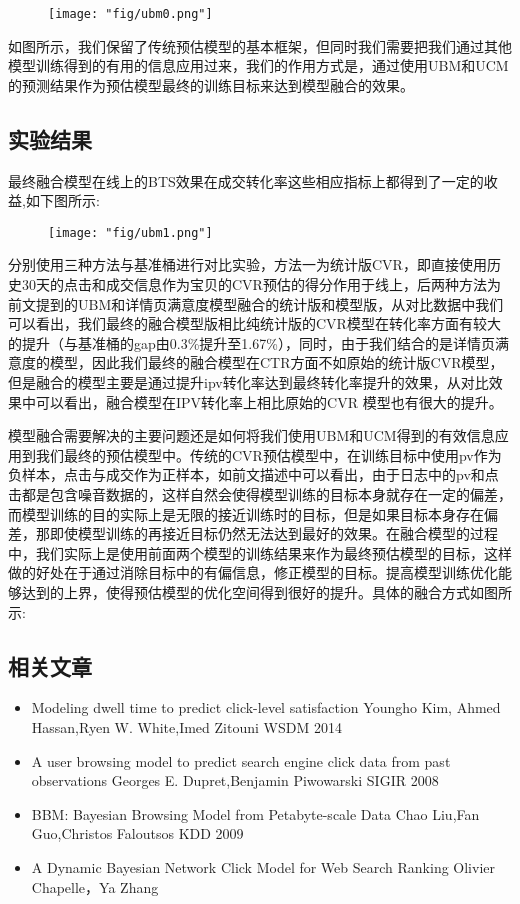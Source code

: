 \begin{figure}[!h]
	\centering
	\texttt{[image: "fig/ubm0.png"]}
	\caption{}
	\label{fig:ubm0}
\end{figure}
	

 如图所示，我们保留了传统预估模型的基本框架，但同时我们需要把我们通过其他模型训练得到的有用的信息应用过来，我们的作用方式是，通过使用UBM和UCM的预测结果作为预估模型最终的训练目标来达到模型融合的效果。
\subsection{实验结果}
最终融合模型在线上的BTS效果在成交转化率这些相应指标上都得到了一定的收益,如下图所示:
\begin{figure}[!h]
	\centering
	\texttt{[image: "fig/ubm1.png"]}
	\caption{}
	\label{fig:ubm1}
\end{figure}

分别使用三种方法与基准桶进行对比实验，方法一为统计版CVR，即直接使用历史30天的点击和成交信息作为宝贝的CVR预估的得分作用于线上，后两种方法为前文提到的UBM和详情页满意度模型融合的统计版和模型版，从对比数据中我们可以看出，我们最终的融合模型版相比纯统计版的CVR模型在转化率方面有较大的提升（与基准桶的gap由0.3\%提升至1.67\%），同时，由于我们结合的是详情页满意度的模型，因此我们最终的融合模型在CTR方面不如原始的统计版CVR模型，但是融合的模型主要是通过提升ipv转化率达到最终转化率提升的效果，从对比效果中可以看出，融合模型在IPV转化率上相比原始的CVR 模型也有很大的提升。



模型融合需要解决的主要问题还是如何将我们使用UBM和UCM得到的有效信息应用到我们最终的预估模型中。传统的CVR预估模型中，在训练目标中使用pv作为负样本，点击与成交作为正样本，如前文描述中可以看出，由于日志中的pv和点击都是包含噪音数据的，这样自然会使得模型训练的目标本身就存在一定的偏差，而模型训练的目的实际上是无限的接近训练时的目标，但是如果目标本身存在偏差，那即使模型训练的再接近目标仍然无法达到最好的效果。在融合模型的过程中，我们实际上是使用前面两个模型的训练结果来作为最终预估模型的目标，这样做的好处在于通过消除目标中的有偏信息，修正模型的目标。提高模型训练优化能够达到的上界，使得预估模型的优化空间得到很好的提升。具体的融合方式如图所示:

\subsection{相关文章}
\begin{itemize}
\item Modeling dwell time to predict click-level satisfaction 	Youngho Kim,	Ahmed Hassan,Ryen W. White,Imed Zitouni   WSDM 2014
\item A user browsing model to predict search engine click data from past observations 	Georges E. Dupret,Benjamin Piwowarski  SIGIR 2008
\item BBM: Bayesian Browsing Model from Petabyte-scale Data Chao Liu,Fan Guo,Christos Faloutsos KDD 2009
\item A Dynamic Bayesian Network Click Model for Web Search Ranking  Olivier Chapelle，Ya Zhang
\end{itemize}



